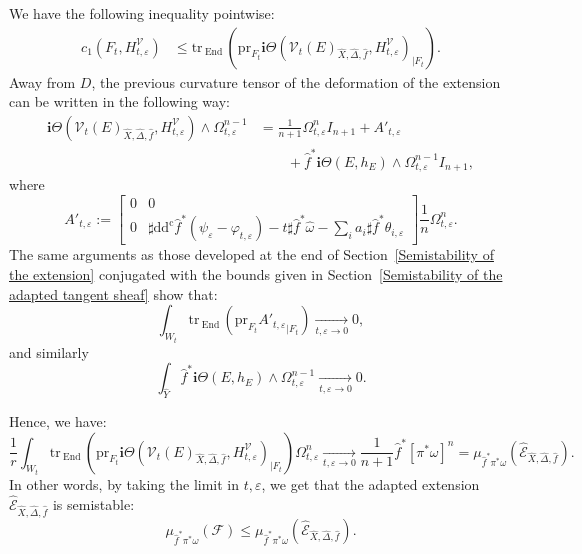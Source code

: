 \documentclass[12pt,a4paper]{amsart}
\newcommand{\End}{\mathrm{End}\,}
\newcommand{\ddc}{\mathrm{dd^c}}
\newcommand{\tr}{\mathrm{tr}\,}
\theoremstyle{plain}
\theoremstyle{definition}
\begin{document}
We have the following inequality pointwise:
\begin{align*}
    c_1(F_t, H^{\mathcal{V}}_{t, \varepsilon}) & \leq \tr_\End(\mathrm{pr}_{F_t} \textbf{i}\Theta(\mathcal{V}_t(E)_{\widehat{X}, \widehat{\Delta}, \widehat{f}}, H^{\mathcal{V}}_{t, \varepsilon})_{|F_t}).
\end{align*}
Away from $D$, the previous curvature tensor of the deformation of the extension can be written in the following way:
\begin{align*}
    \textbf{i}\Theta(\mathcal{V}_t(E)_{\widehat{X}, \widehat{\Delta}, \widehat{f}}, H^{\mathcal{V}}_{t, \varepsilon}) \wedge \Omega_{t, \varepsilon}^{n-1} & = \frac{1}{n+1} \Omega_{t, \varepsilon}^n I_{n+1} + A'_{t, \varepsilon} \\
    & \qquad + \widehat{f}^*\textbf{i}\Theta(E, h_E) \wedge \Omega_{t, \varepsilon}^{n-1} I_{n+1},
\end{align*}
where 
$$
    A'_{t, \varepsilon} :=
\begin{bmatrix}
    0 & 0 \\
    0 & \sharp \ddc \widehat{f}^*(\psi_\varepsilon - \varphi_{t, \varepsilon}) - t\sharp \widehat{f}^*\widehat{\omega} - \sum_i a_i \sharp \widehat{f}^*\theta_{i, \varepsilon}
\end{bmatrix}
\frac{1}{n}\Omega_{t, \varepsilon}^n.
$$
The same arguments as those developed at the end of Section~\ref{Semistability of the extension} conjugated with the bounds given in Section~\ref{Semistability of the adapted tangent sheaf} show that:
$$
\int_{W_t} \tr_\End(\mathrm{pr}_{F_t} {A'_{t, \varepsilon}}_{|F_t}) \underset{t, \varepsilon \to 0}{\longrightarrow} 0,
$$
and similarly
$$
\int_{\widehat{Y}} \widehat{f}^*\textbf{i}\Theta(E, h_E) \wedge \Omega_{t, \varepsilon}^{n-1} \underset{t, \varepsilon \to 0}{\longrightarrow} 0.
$$

Hence, we have:
$$
\frac{1}{r}\int_{W_t} \tr_\End(\mathrm{pr}_{F_t}\textbf{i}\Theta(\mathcal{V}_t(E)_{\widehat{X}, \widehat{\Delta}, \widehat{f}}, H^{\mathcal{V}}_{t, \varepsilon})_{|F_t}) \Omega_{t, \varepsilon}^n \underset{t, \varepsilon \to 0}{\longrightarrow}\frac{1}{n+1} \widehat{f}^* \left[ \pi^*\omega \right]^{n} = \mu_{\widehat{f}^*\pi^*\omega}(\widehat{\mathcal{E}}_{\widehat{X}, \widehat{\Delta}, \widehat{f}}).
$$
In other words, by taking the limit in $t, \varepsilon$, we get that the adapted extension $\widehat{\mathcal{E}}_{\widehat{X}, \widehat{\Delta}, \widehat{f}}$ is semistable:
$$
\mu_{\widehat{f}^*\pi^*\omega}(\mathcal{F}) \leq \mu_{\widehat{f}^*\pi^*\omega}(\widehat{\mathcal{E}}_{\widehat{X}, \widehat{\Delta}, \widehat{f}}).
$$
\end{document}
